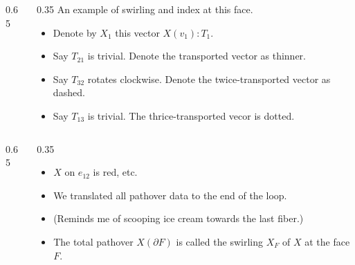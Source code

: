 \begin{frame}
\begin{columns}
\begin{column}{0.65\textwidth}
\vspace{12pt}
\begingroup
{}

\endgroup
\end{column}
\begin{column}{0.35\textwidth}
An example of \alert{swirling} and \alert{index} at this face.
\begin{itemize}
\item<1-> Denote by \( X_1 \) this vector \( X(v_1):T_1 \).
\item<1-> Say \( T_{21} \) is trivial. Denote the transported vector as thinner.
\item<1-> Say \( T_{32} \) rotates clockwise. Denote the twice-transported vector as dashed.
\item<1-> Say \( T_{13} \) is trivial. The thrice-transported vecor is dotted.
\end{itemize}
\end{column}
\end{columns}
\end{frame}

\begin{frame}
\begin{columns}
\begin{column}{0.65\textwidth}
\vspace{12pt}
\begingroup
{}

\endgroup
\end{column}
\begin{column}{0.35\textwidth}
\begin{itemize}
\item<1-> \( X \) on \( e_{12} \) is red, etc.
\item<2-> We translated all pathover data to the end of the loop.
\item<3-> (Reminds me of scooping ice cream towards the last fiber.)
\item<4-> The total pathover \( X(\partial F) \) is called \alert{the swirling \( X_F \)} of \( X \) at the face \( F \).
\end{itemize}
\end{column}
\end{columns}
\end{frame}

